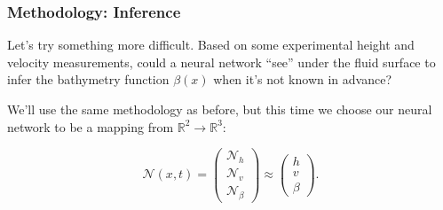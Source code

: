 \begin{frame}
    \frametitle{Methodology: Inference}

    Let's try something more difficult. Based on some experimental height and velocity measurements, could a neural 
    network ``see'' under the fluid surface to infer the bathymetry function $\beta(x)$ when it's not known in advance?

    \bigskip
    \pause

    We'll use the same methodology as before, but this time we choose our neural network to be a mapping from 
    $\mathbb{R}^2 \to \mathbb{R}^3$:

    $$
    \mathcal{N}(x, t) = \begin{pmatrix*}
        \mathcal{N}_h \\
        \mathcal{N}_v \\
        \mathcal{N}_{\beta}
    \end{pmatrix*} \approx \begin{pmatrix*}
        h \\
        v \\
        \beta
    \end{pmatrix*}.
    $$
\end{frame}